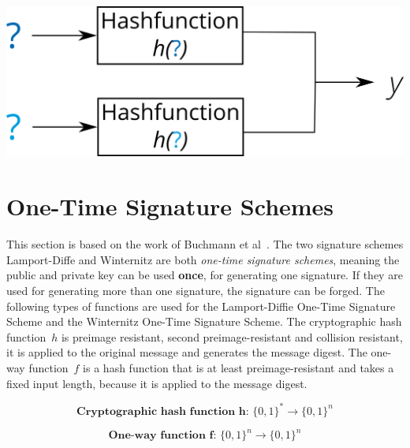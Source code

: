\begin{enumerate}
\begin{minipage}[t]{.6\linewidth}
          	\raggedright
            \includegraphics[width=.8\linewidth]{images/Background/collission_res_horizontal.png}
	      \end{minipage}
	      
\end{enumerate}	      


\section{One-Time Signature Schemes}
This section is based on the work of Buchmann et al~\cite{book_pqc_bernstein_2004}. 
The two signature schemes Lamport-Diffe and Winternitz are both \textit{one-time signature schemes}, meaning the public and private key can be used \textbf{once}, for generating one signature. If they are used for generating more than one signature, the signature can be forged. %
The following types of functions are used for the Lamport-Diffie One-Time Signature Scheme and the Winternitz One-Time Signature Scheme. 
The cryptographic hash function~$h$ is preimage resistant, second preimage-resistant and collision resistant, it is applied to the original message and generates the message digest.
The one-way function~$f$ is a hash function that is at least preimage-resistant and takes a fixed input length, because it is applied to the message digest.%

\begin{equation}
\label{eq:basic_hashfunc}
\textbf{Cryptographic hash function h: } \lbrace 0,1 \rbrace^* \rightarrow \lbrace 0,1 \rbrace^n
\end{equation}

\begin{equation}
\label{eq:one-way-func}
\textbf{One-way function f: } \lbrace 0,1 \rbrace^n \rightarrow \lbrace 0,1 \rbrace ^n
\end{equation}


